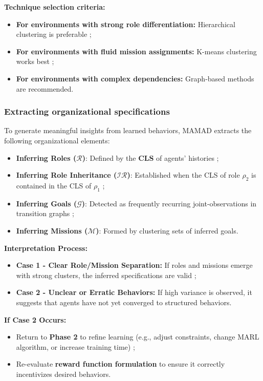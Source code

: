 \documentclass[pdflatex,sn-mathphys-num]{sn-jnl}%
\theoremstyle{thmstyleone}%
\theoremstyle{thmstyletwo}%
\theoremstyle{thmstylethree}%
\begin{document}
\noindent \textbf{Technique selection criteria:}
\begin{itemize}
    \item \textbf{For environments with strong role differentiation:} Hierarchical clustering is preferable ;
    \item \textbf{For environments with fluid mission assignments:} K-means clustering works best ;
    \item \textbf{For environments with complex dependencies:} Graph-based methods are recommended.
\end{itemize}

\subsubsection{Extracting organizational specifications}
To generate meaningful insights from learned behaviors, MAMAD extracts the following organizational elements:

\begin{itemize}
    \item \textbf{Inferring Roles ($\mathcal{R}$)}: Defined by the \textbf{CLS} of agents' histories ;
    \item \textbf{Inferring Role Inheritance ($\mathcal{IR}$)}: Established when the CLS of role $\rho_2$ is contained in the CLS of $\rho_1$ ;
    \item \textbf{Inferring Goals ($\mathcal{G}$)}: Detected as frequently recurring joint-observations in transition graphs ;
    \item \textbf{Inferring Missions ($\mathcal{M}$)}: Formed by clustering sets of inferred goals.
\end{itemize}

\noindent \textbf{Interpretation Process:}
\begin{itemize}
    \item \textbf{Case 1 - Clear Role/Mission Separation:} If roles and missions emerge with strong clusters, the inferred specifications are valid ;
    \item \textbf{Case 2 - Unclear or Erratic Behaviors:} If high variance is observed, it suggests that agents have not yet converged to structured behaviors.
\end{itemize}

\noindent \textbf{If Case 2 Occurs:}
\begin{itemize}
    \item Return to \textbf{Phase 2} to refine learning (e.g., adjust constraints, change MARL algorithm, or increase training time) ;
    \item Re-evaluate \textbf{reward function formulation} to ensure it correctly incentivizes desired behaviors.
\end{itemize}
\end{document}
